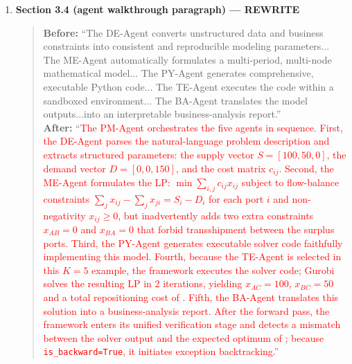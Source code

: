\documentclass[11pt,a4paper]{article}
\begin{document}
\begin{enumerate}
\item \textbf{Section 3.4 (agent walkthrough paragraph) --- REWRITE}
\begin{quote}
\textbf{Before:} ``The DE-Agent converts unstructured data and business constraints into consistent and reproducible modeling parameters... The ME-Agent automatically formulates a multi-period, multi-node mathematical model... The PY-Agent generates comprehensive, executable Python code... The TE-Agent executes the code within a sandboxed environment... The BA-Agent translates the model outputs...into an interpretable business-analysis report.''\\[4pt]
\textbf{After:} ``\textcolor{red}{The PM-Agent orchestrates the five agents in sequence. First, the DE-Agent parses the natural-language problem description and extracts structured parameters: the supply vector $S{=}[100,50,0]$, the demand vector $D{=}[0,0,150]$, and the cost matrix $c_{ij}$. Second, the ME-Agent formulates the LP: $\min \sum_{i,j}c_{ij}x_{ij}$ subject to flow-balance constraints $\sum_j x_{ij}-\sum_j x_{ji}=S_i-D_i$ for each port $i$ and non-negativity $x_{ij}\geq 0$, but inadvertently adds two extra constraints $x_{AB}{=}0$ and $x_{BA}{=}0$ that forbid transshipment between the surplus ports. Third, the PY-Agent generates executable solver code faithfully implementing this model. Fourth, because the TE-Agent is selected in this $K{=}5$ example, the framework executes the solver code; Gurobi solves the resulting LP in 2 iterations, yielding $x_{AC}{=}100$, $x_{BC}{=}50$ and a total repositioning cost of . Fifth, the BA-Agent translates this solution into a business-analysis report. After the forward pass, the framework enters its unified verification stage and detects a mismatch between the solver output and the expected optimum of ; because \texttt{is\_backward=True}, it initiates exception backtracking.}''
\end{quote}


\end{enumerate}
\end{document}

